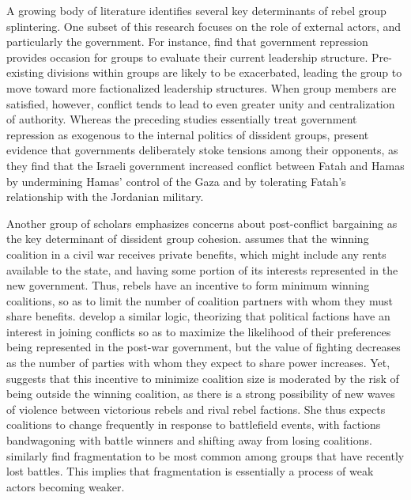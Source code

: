 \documentclass[12pt,]{book}
\begin{document}
A growing body of literature identifies several key determinants of
rebel group splintering. One subset of this research focuses on the role
of external actors, and particularly the government. For instance,
\citet{McLauchlin2012} find that government repression provides occasion
for groups to evaluate their current leadership structure. Pre-existing
divisions within groups are likely to be exacerbated, leading the group
to move toward more factionalized leadership structures. When group
members are satisfied, however, conflict tends to lead to even greater
unity and centralization of authority. Whereas the preceding studies
essentially treat government repression as exogenous to the internal
politics of dissident groups, \citet{Bhavnani2011} present evidence that
governments deliberately stoke tensions among their opponents, as they
find that the Israeli government increased conflict between Fatah and
Hamas by undermining Hamas' control of the Gaza and by tolerating
Fatah's relationship with the Jordanian military.

Another group of scholars emphasizes concerns about post-conflict
bargaining as the key determinant of dissident group cohesion.
\citet{Christia2012} assumes that the winning coalition in a civil war
receives private benefits, which might include any rents available to
the state, and having some portion of its interests represented in the
new government. Thus, rebels have an incentive to form minimum winning
coalitions, so as to limit the number of coalition partners with whom
they must share benefits. \citet{Wolford} develop a similar logic,
theorizing that political factions have an interest in joining conflicts
so as to maximize the likelihood of their preferences being represented
in the post-war government, but the value of fighting decreases as the
number of parties with whom they expect to share power increases. Yet,
\citet{Christia2012} suggests that this incentive to minimize coalition
size is moderated by the risk of being outside the winning coalition, as
there is a strong possibility of new waves of violence between
victorious rebels and rival rebel factions. She thus expects coalitions
to change frequently in response to battlefield events, with factions
bandwagoning with battle winners and shifting away from losing
coalitions. \citet{Findley2012} similarly find fragmentation to be most
common among groups that have recently lost battles. This implies that
fragmentation is essentially a process of weak actors becoming weaker.
\end{document}
